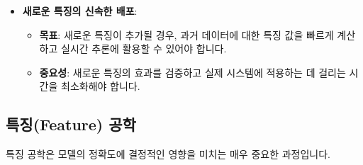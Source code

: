 \documentclass[11pt,a4paper]{article}
\theoremstyle{definition}
\begin{document}
\begin{itemize}
\begin{itemize}
\begin{itemize}
\begin{itemize}
\begin{itemize}
\begin{itemize}
        \item \textbf{목표}: 데이터 과학자들이 새로운 특징(feature)과 규칙(rule)을 쉽게 정의하고 관리하며 배포할 수 있어야 합니다.
        \item \textbf{중요성}: 사기 패턴은 계속 진화하므로, 시스템이 새로운 위협에 신속하게 대응할 수 있도록 유연성이 필요합니다. 기존 시스템은 특징 변경이 매우 어려웠습니다.
    \end{itemize}
    \item \textbf{새로운 특징의 신속한 배포}:
    \begin{itemize}
        \item \textbf{목표}: 새로운 특징이 추가될 경우, 과거 데이터에 대한 특징 값을 빠르게 계산하고 실시간 추론에 활용할 수 있어야 합니다.
        \item \textbf{중요성}: 새로운 특징의 효과를 검증하고 실제 시스템에 적용하는 데 걸리는 시간을 최소화해야 합니다.
    \end{itemize}
\end{itemize}

\subsection*{특징(Feature) 공학}

특징 공학은 모델의 정확도에 결정적인 영향을 미치는 매우 중요한 과정입니다.


\end{itemize}
\end{itemize}
\end{itemize}
\end{itemize}
\end{document}
